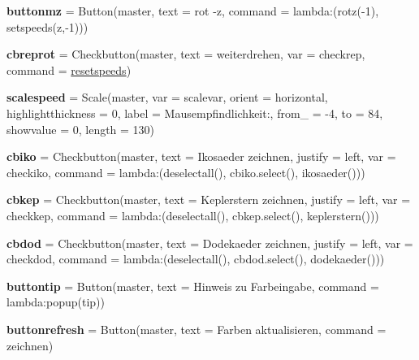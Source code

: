 \begin{DoxyCompactItemize}
\item 
\mbox{\label{namespacelatest_ae31f92ae6b267c4912b4077d5240d21c}} 
{\bfseries buttonmz} = Button(master, text = \textquotesingle{}rot -\/z\textquotesingle{}, command = lambda\+:(rotz(-\/1), setspeeds(\textquotesingle{}z\textquotesingle{},-\/1)))
\item 
\mbox{\label{namespacelatest_a2b91952cf353a08cca122fdd9cb35433}} 
{\bfseries cbreprot} = Checkbutton(master, text = \textquotesingle{}weiterdrehen\textquotesingle{}, var = checkrep, command = \hyperlink{namespacelatest_a9b0b73ed3a6e0087dc5aca0cc80ecaee}{resetspeeds})
\item 
\mbox{\label{namespacelatest_a3588091e1dc32ba8d09713358351e233}} 
{\bfseries scalespeed} = Scale(master, var = scalevar, orient = \textquotesingle{}horizontal\textquotesingle{}, highlightthickness = 0, label = \textquotesingle{}Mausempfindlichkeit\+:\textquotesingle{}, from\+\_\+ = -\/4, to = 84, showvalue = 0, length = 130)
\item 
\mbox{\label{namespacelatest_a1ef392806a6afbac0a6e859ada1bec66}} 
{\bfseries cbiko} = Checkbutton(master, text = \textquotesingle{}Ikosaeder zeichnen\textquotesingle{}, justify = \textquotesingle{}left\textquotesingle{}, var = checkiko, command = lambda\+:(deselectall(), cbiko.\+select(), ikosaeder()))
\item 
\mbox{\label{namespacelatest_a82dbc31506b4e44e7fd2074d046835c3}} 
{\bfseries cbkep} = Checkbutton(master, text = \textquotesingle{}Keplerstern zeichnen\textquotesingle{}, justify = \textquotesingle{}left\textquotesingle{}, var = checkkep, command = lambda\+:(deselectall(), cbkep.\+select(), keplerstern()))
\item 
\mbox{\label{namespacelatest_a940cf4df117d5faa9a1096824cb8358f}} 
{\bfseries cbdod} = Checkbutton(master, text = \textquotesingle{}Dodekaeder zeichnen\textquotesingle{}, justify = \textquotesingle{}left\textquotesingle{}, var = checkdod, command = lambda\+:(deselectall(), cbdod.\+select(), dodekaeder()))
\item 
\mbox{\label{namespacelatest_a77d6c88ce6dcf9c9f27935f1a7d70cf4}} 
{\bfseries buttontip} = Button(master, text = \textquotesingle{}Hinweis zu Farbeingabe\textquotesingle{}, command = lambda\+:popup(\textquotesingle{}tip\textquotesingle{}))
\item 
\mbox{\label{namespacelatest_ab20db653324addb8c48025d2a5031201}} 
{\bfseries buttonrefresh} = Button(master, text = \textquotesingle{}Farben aktualisieren\textquotesingle{}, command = zeichnen)
\end{DoxyCompactItemize}



